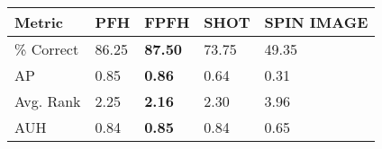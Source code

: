 \begin{tabular}{ | l || l | l | l | l | }
\hline
Metric & PFH & FPFH & SHOT & SPIN IMAGE \\
\hline
 \% Correct & 86.25 & \bf 87.50 & 73.75 & 49.35 \\
AP & 0.85 & \bf 0.86 & 0.64 & 0.31 \\
Avg. Rank & 2.25 & \bf 2.16 & 2.30 & 3.96 \\
AUH & 0.84 & \bf 0.85 & 0.84 & 0.65 \\
\hline
\end{tabular}